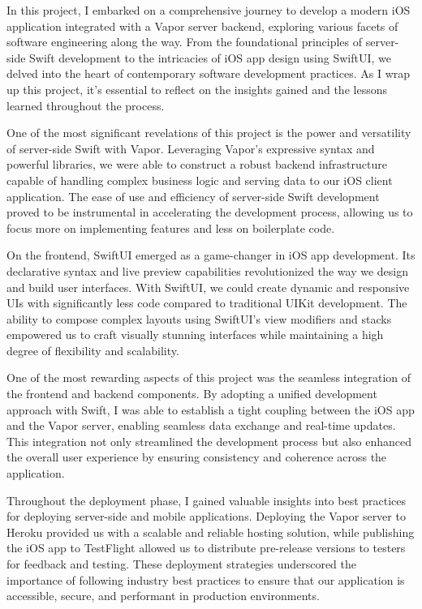\documentclass[
  language=english,
  figures=false,
  sourcecodes,
  index
]{kidiplom}
\begin{document}
\begin{kiconclusions}

In this project, I embarked on a comprehensive journey to develop a modern iOS application integrated with a Vapor server backend, exploring various facets of software engineering along the way. From the foundational principles of server-side Swift development to the intricacies of iOS app design using SwiftUI, we delved into the heart of contemporary software development practices. As I wrap up this project, it's essential to reflect on the insights gained and the lessons learned throughout the process.

One of the most significant revelations of this project is the power and versatility of server-side Swift with Vapor. Leveraging Vapor's expressive syntax and powerful libraries, we were able to construct a robust backend infrastructure capable of handling complex business logic and serving data to our iOS client application. The ease of use and efficiency of server-side Swift development proved to be instrumental in accelerating the development process, allowing us to focus more on implementing features and less on boilerplate code.

On the frontend, SwiftUI emerged as a game-changer in iOS app development. Its declarative syntax and live preview capabilities revolutionized the way we design and build user interfaces. With SwiftUI, we could create dynamic and responsive UIs with significantly less code compared to traditional UIKit development. The ability to compose complex layouts using SwiftUI's view modifiers and stacks empowered us to craft visually stunning interfaces while maintaining a high degree of flexibility and scalability.

One of the most rewarding aspects of this project was the seamless integration of the frontend and backend components. By adopting a unified development approach with Swift, I was able to establish a tight coupling between the iOS app and the Vapor server, enabling seamless data exchange and real-time updates. This integration not only streamlined the development process but also enhanced the overall user experience by ensuring consistency and coherence across the application.

Throughout the deployment phase, I gained valuable insights into best practices for deploying server-side and mobile applications. Deploying the Vapor server to Heroku provided us with a scalable and reliable hosting solution, while publishing the iOS app to TestFlight allowed us to distribute pre-release versions to testers for feedback and testing. These deployment strategies underscored the importance of following industry best practices to ensure that our application is accessible, secure, and performant in production environments.


\end{kiconclusions}
\end{document}
